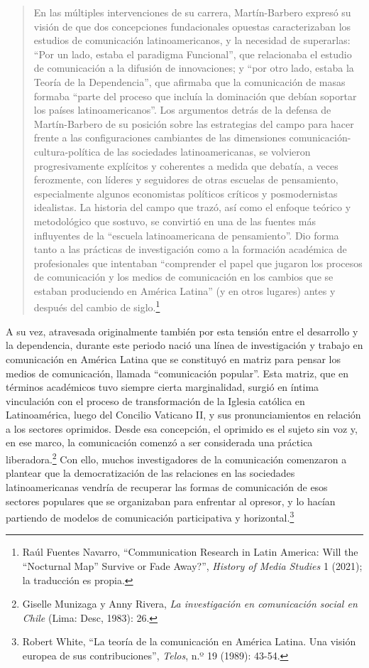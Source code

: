 \documentclass{tufte-handout}
\begin{document}
\begin{quote}
En las múltiples intervenciones de su carrera, Martín-Barbero expresó su
visión de que dos concepciones fundacionales opuestas caracterizaban los
estudios de comunicación latinoamericanos, y la necesidad de superarlas:
``Por un lado, estaba el paradigma Funcional'', que relacionaba el
estudio de comunicación a la difusión de innovaciones; y ``por otro
lado, estaba la Teoría de la Dependencia'', que afirmaba que la
comunicación de masas formaba ``parte del proceso que incluía la
dominación que debían soportar los países latinoamericanos''. Los
argumentos detrás de la defensa de Martín-Barbero de su posición sobre
las estrategias del campo para hacer frente a las configuraciones
cambiantes de las dimensiones comunicación-cultura-política de las
sociedades latinoamericanas, se volvieron progresivamente explícitos y
coherentes a medida que debatía, a veces ferozmente, con líderes y
seguidores de otras escuelas de pensamiento, especialmente algunos
economistas políticos críticos y posmodernistas idealistas. La historia
del campo que trazó, así como el enfoque teórico y metodológico que
sostuvo, se convirtió en una de las fuentes más influyentes de la
``escuela latinoamericana de pensamiento''. Dio forma tanto a las
prácticas de investigación como a la formación académica de
profesionales que intentaban ``comprender el papel que jugaron los
procesos de comunicación y los medios de comunicación en los cambios que
se estaban produciendo en América Latina'' (y en otros lugares) antes y
después del cambio de siglo.\footnote{Raúl Fuentes Navarro,
  ``Communication Research in Latin America: Will the ``Nocturnal Map''
  Survive or Fade Away?'', \emph{History of Media Studies} 1 (2021); la
  traducción es propia.}
\end{quote}

A su vez, atravesada originalmente también por esta tensión entre el
desarrollo y la dependencia, durante este periodo nació una línea de
investigación y trabajo en comunicación en América Latina que se
constituyó en matriz para pensar los medios de comunicación, llamada
``comunicación popular''. Esta matriz, que en términos académicos tuvo
siempre cierta marginalidad, surgió en íntima vinculación con el proceso
de transformación de la Iglesia católica en Latinoamérica, luego del
Concilio Vaticano II, y sus pronunciamientos en relación a los sectores
oprimidos. Desde esa concepción, el oprimido es el sujeto sin voz y, en
ese marco, la comunicación comenzó a ser considerada una práctica
liberadora.\footnote{Giselle Munizaga y Anny Rivera, \emph{La
  investigación en comunicación social en Chile} (Lima: Desc, 1983): 26.}
Con ello, muchos investigadores de la comunicación comenzaron a plantear
que la democratización de las relaciones en las sociedades
latinoamericanas vendría de recuperar las formas de comunicación de esos
sectores populares que se organizaban para enfrentar al opresor, y lo
hacían partiendo de modelos de comunicación participativa y
horizontal.\footnote{Robert White, ``La teoría de la comunicación en
  América Latina. Una visión europea de sus contribuciones'',
  \emph{Telos}, n.º 19 (1989): 43-54.}
  
\end{document}
